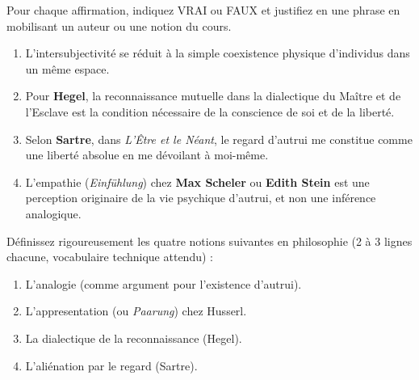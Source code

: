 \documentclass[11pt]{article}
\begin{document}
\begin{exercice}
Pour chaque affirmation, indiquez VRAI ou FAUX et justifiez en une phrase en mobilisant un auteur ou une notion du cours.
\begin{enumerate}
    \item L'intersubjectivité se réduit à la simple coexistence physique d'individus dans un même espace.
    \item Pour \textbf{Hegel}, la reconnaissance mutuelle dans la dialectique du Maître et de l'Esclave est la condition nécessaire de la conscience de soi et de la liberté.
    \item Selon \textbf{Sartre}, dans \emph{L'Être et le Néant}, le regard d'autrui me constitue comme une liberté absolue en me dévoilant à moi-même.
    \item L'empathie (\emph{Einfühlung}) chez \textbf{Max Scheler} ou \textbf{Edith Stein} est une perception originaire de la vie psychique d'autrui, et non une inférence analogique.
\end{enumerate}
\end{exercice}

\begin{exercice}
Définissez rigoureusement les quatre notions suivantes en philosophie (2 à 3 lignes chacune, vocabulaire technique attendu) :
\begin{enumerate}
    \item L'analogie (comme argument pour l'existence d'autrui).
    \item L'appresentation (ou \emph{Paarung}) chez Husserl.
    \item La dialectique de la reconnaissance (Hegel).
    \item L'aliénation par le regard (Sartre).
\end{enumerate}
\end{exercice}
\end{document}
